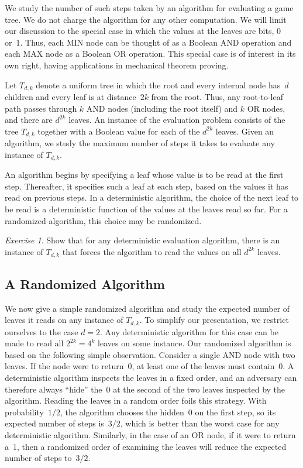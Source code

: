 \documentclass[twoside,12pt]{book}
\theoremstyle{plain}
\theoremstyle{definition}
\theoremstyle{remark}
\newtheorem{exercise}[theorem]{Exercise}
\begin{document}
We study the number of such steps taken by an algorithm for evaluating a game
tree.  We do not charge the algorithm for any other computation.  We will
limit our discussion to the special case in which the values at the leaves are
bits, 0 or~1.  Thus, each MIN node can be thought of as a Boolean AND
operation and each MAX node as a Boolean OR operation.  This special case is
of interest in its own right, having applications in mechanical theorem
proving.

Let $T_{d,k}$ denote a uniform tree in which the root and every internal node
has~$d$ children and every leaf is at distance~$2k$ from the root.  Thus, any
root-to-leaf path passes through $k$ AND nodes (including the root itself)
and $k$ OR nodes, and there are $d^{2k}$ leaves.  An instance of the
evaluation problem consists of the tree $T_{d,k}$ together with a Boolean
value for each of the $d^{2k}$ leaves.  Given an algorithm, we study the
maximum number of steps it takes to evaluate any instance of $T_{d,k}$.

An algorithm begins by specifying a leaf whose value is to be read at the
first step.  Thereafter, it specifies such a leaf at each step, based on the
values it has read on previous steps.  In a deterministic algorithm, the
choice of the next leaf to be read is a deterministic function of the values
at the leaves read so far.  For a randomized algorithm, this choice may be
randomized.

\begin{exercise}
Show that for any deterministic evaluation algorithm, there is an instance of
$T_{d,k}$ that forces the algorithm to read the values on all $d^{2k}$ leaves.
\end{exercise}

\subsection{A Randomized Algorithm}

We now give a simple randomized algorithm and study the expected number of
leaves it reads on any instance of $T_{d,k}$.  To simplify our presentation,
we restrict ourselves to the case $d=2$.  Any deterministic algorithm for this
case can be made to read all $2^{2k}=4^k$ leaves on some instance.  Our
randomized algorithm is based on the following simple observation.  Consider
a single AND node with two leaves.  If the node were to return~0, at least
one of the leaves must contain~0.  A deterministic algorithm inspects the
leaves in a fixed order, and an adversary can therefore always ``hide'' the~0
at the second of the two leaves inspected by the algorithm.  Reading the
leaves in a random order foils this strategy.  With probability~$1/2$, the
algorithm chooses the hidden~0 on the first step, so its expected number of
steps is~$3/2$, which is better than the worst case for any deterministic
algorithm.  Similarly, in the case of an OR node, if it were to return a~1,
then a randomized order of examining the leaves will reduce the expected
number of steps to~$3/2$.
\end{document}
